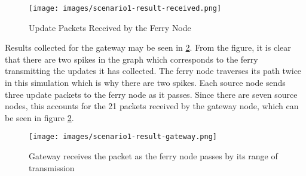\begin{figure}[ht]
    \centering
    \texttt{[image: images/scenario1-result-received.png]}
    \caption{Update Packets Received by the Ferry Node}
    \label{fig:result1-a}
\end{figure}

Results collected for the gateway may be seen in \ref{fig:result1-b}.
From the figure, it is clear that there are two spikes in the graph which corresponds to the ferry transmitting the updates it has collected. 
The ferry node traverses its path twice in this simulation which is why there are two spikes.
Each source node sends three update packets to the ferry node as it passes.  
Since there are seven source nodes, this accounts for the 21 packets received by the gateway node, which can be seen in figure \ref{fig:result1-b}.

\begin{figure}[ht]
    \centering
    \texttt{[image: images/scenario1-result-gateway.png]}
    \caption{Gateway receives the packet as the ferry node passes by its range of transmission}
    \label{fig:result1-b}
\end{figure}

